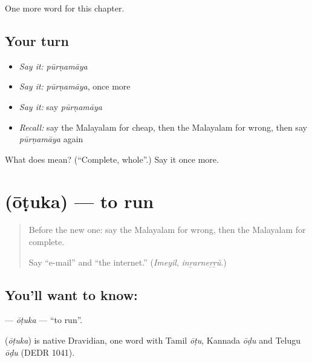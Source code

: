 \begin{grammarlens}[title={What you've built}]
One more word for this chapter.
\end{grammarlens}

\subsection*{Your turn}
\begin{itemize}
\raggedright
  \item \emph{Say it:} \emph{pūrṇamāya}
  \item \emph{Say it:} \emph{pūrṇamāya}, once more
  \item \emph{Say it:} say \emph{pūrṇamāya}
  \item \emph{Recall:} say the Malayalam for cheap, then the Malayalam for wrong, then say \emph{pūrṇamāya} again
\end{itemize}

\begin{tcolorbox}[breakable,colback=teal!4,colframe=teal!35!black,title={Before you move on}]
What does  mean? (\textquotedblleft{}Complete, whole\textquotedblright{}.) Say it once more.
\end{tcolorbox}
\section[\texorpdfstring{\ml{ഓടുക} (ōṭuka)}{ഓടുക (ōṭuka)}]{ (ōṭuka) — to run}

\label{lesson:ML-C170-otuka}



\begin{quote}
Before the new one: say the Malayalam for wrong, then the Malayalam for complete.

Say \textquotedblleft{}e-mail\textquotedblright{} and \textquotedblleft{}the internet.\textquotedblright{} (\emph{Imeyil}, \emph{inṟarneṟṟŭ}.)
\end{quote}

\subsection*{You'll want to know: }
\textbf{} — \emph{ōṭuka} — \textquotedblleft{}to run\textquotedblright{}.

\begin{cousinweb}
\textbf{} (\emph{ōṭuka}) is native Dravidian, one word with Tamil \emph{ōṭu}, Kannada \emph{ōḍu} and Telugu \emph{ōḍu} (DEDR 1041).
\end{cousinweb}

